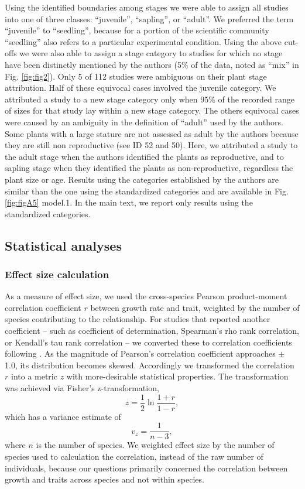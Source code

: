 \documentclass[a4paper]{article}\usepackage[]{graphicx}\usepackage[]{color}
\begin{document}
Using the identified boundaries among stages we were able to assign all studies into one of three classes: ``juvenile'', ``sapling'', or ``adult''.  We preferred the term ``juvenile'' to ``seedling'', because for a portion of the scientific community ``seedling'' also refers to a particular experimental condition. Using the above cut-offs we were also able to assign a stage category to studies for which no stage have been distinctly mentioned by the authors (5\% of the data, noted as ``mix'' in Fig. \ref{fig:fig2}). Only 5 of 112 studies were ambiguous on their plant stage attribution. Half of these equivocal cases involved the juvenile category. We attributed a study to a new stage category only when 95\% of the recorded range of sizes for that study lay within a new stage category. The others equivocal cases were caused by an ambiguity in the definition of ``adult'' used by the authors. Some plants with a large stature are not assessed as adult by the authors because they are still non reproductive (see ID 52 and 50). Here, we attributed a study to the adult stage when the authors identified the plants as reproductive, and to sapling stage when they identified the plants as non-reproductive, regardless the plant size or age. Results using the categories established by the authors are similar than the one using the standardized categories and are available in Fig. \ref{fig:figA5} model.1. In the main text, we report only results using the standardized categories.

\subsection*{Statistical analyses}\label{statistical-analyses}

\subsubsection*{Effect size calculation}

As a measure of effect size, we used the cross-species Pearson product-moment correlation coefficient $r$ between growth rate and trait, weighted by the number of species contributing to the relationship. For studies that reported another coefficient -- such as coefficient of determination, Spearman's rho rank correlation, or Kendall's tau rank correlation -- we converted these to correlation coefficients following \citet{Lajeunesse:2013tm}. As the magnitude of Pearson's correlation coefficient approaches $\pm$ 1.0, its distribution becomes skewed. Accordingly we transformed the correlation $r$ into a metric $z$ with more-desirable statistical properties. The transformation was achieved via Fisher's z-transformation,
\[ z = \frac{1}{2} \ln \frac{1+r}{1-r}, \]
which has a variance estimate of
\[ v_z= \frac{1}{n-3}, \]
where $n$ is the number of species. We weighted effect size by the number of species used to calculation the correlation, instead of the raw number of individuals, because our questions primarily concerned the correlation between growth and traits across species and not within species.
\end{document}
